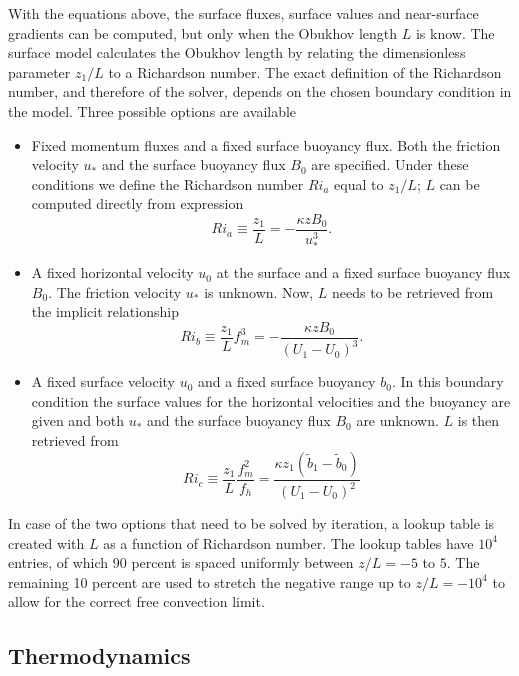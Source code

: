 \documentclass[gmd]{copernicus}
\begin{document}
With the equations above, the surface fluxes, surface values and near-surface gradients can be computed, but only when the Obukhov length $L$ is know. The surface model calculates the Obukhov length by relating the dimensionless parameter $z_1/ L$ to a Richardson number. The exact definition of the Richardson number, and therefore of the solver, depends on the chosen boundary condition in the model. Three possible options are available
\begin{itemize}
	\item Fixed momentum fluxes and a fixed surface buoyancy flux. Both the friction velocity $u_*$ and the surface buoyancy flux $B_0$ are specified. Under these conditions we define the Richardson number $Ri_a$ equal to $z_1/L$; $L$ can be computed directly from expression
	\begin{equation}
	Ri_a \equiv \dfrac{z_1}{L} = - \dfrac{\kappa z B_0}{u_*^3}.
	\end{equation}
	\item A fixed horizontal velocity $u_0$ at the surface and a fixed surface buoyancy flux $B_0$. The friction velocity $u_*$ is unknown. Now,  $L$ needs to be retrieved from the implicit relationship 
	\begin{equation}
	Ri_b \equiv \dfrac{z_1}{L} f_m^3 = - \dfrac{\kappa z B_0}{ \left(U_1 - U_0 \right)^3}.
	\end{equation}
	\item A fixed surface velocity $u_0$ and a fixed surface buoyancy $b_0$. In this boundary condition the surface values for the horizontal velocities and the buoyancy are given and both $u_*$ and the surface buoyancy flux $B_0$ are unknown. $L$ is then retrieved from
	\begin{equation}
	Ri_c \equiv \dfrac{z_1}{L} \dfrac{f_m^2}{f_h} = \dfrac{\kappa z_1 \left(\widetilde{b}_1 - \widetilde{b}_0 \right)}{ \left(U_1 - U_0 \right)^2}
	\end{equation}
\end{itemize}
In case of the two options that need to be solved by iteration, a lookup table is created  with $L$ as a function of Richardson number. The lookup tables have $10^4$ entries, of which 90 percent is spaced uniformly between $z/L = -5$ to $5$. The remaining 10 percent are used to stretch the negative range up to $z/L = -10^4$ to allow for the correct free convection limit.

\subsection{Thermodynamics}
\end{document}
